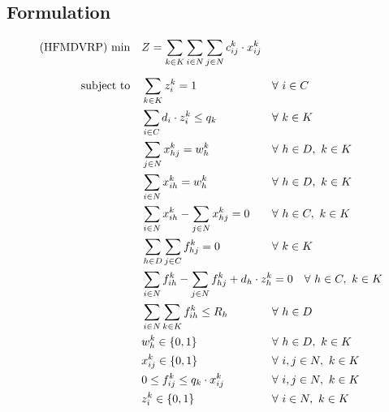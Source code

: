 \documentclass[preprint,review,12pt]{elsarticle}
\begin{document}
\subsection{Formulation}

\begin{align}
    \text{(HFMDVRP) min} \quad        & Z = \sum\limits_{k\in K}\sum\limits_{i\in N}\sum\limits_{j\in N} c_{ij}^k \cdot x_{ij}^k    && \label{MDMVRP_FObj}    \\[5pt]
	\noindent \text{subject to} \quad & \sum\limits_{k \in K} z_{i}^k = 1  && \text{\hspace{-1cm}} \forall \ i \in C \label{MDMVRP_Service} \\
	& \sum\limits_{i \in C}d_i \cdot z_{i}^k \leq q_k               && \text{\hspace{-1cm}} \forall \ k \in K  \label{MDMVRP_Capacity} \\
	& \sum\limits_{j \in N}x_{hj}^k = w_h^k                                         && \text{\hspace{-1cm}} \forall \ h \in D,\ k \in K \label{MDMVRP_StartRoute} \\
	& \sum\limits_{i \in N}x_{ih}^k = w_h^k                                         && \text{\hspace{-1cm}} \forall \ h \in D,\ k \in K \label{MDMVRP_EndRoute} \\
	& \sum\limits_{i \in N}x_{ih}^k - \sum\limits_{j \in N}x_{hj}^k = 0             && \text{\hspace{-1cm}} \forall \ h \in C,\ k \in K \label{MDMVRP_Balance} \\
	& \sum\limits_{h \in D}\sum\limits_{j \in C}f_{hj}^k = 0 && \text{\hspace{-1cm}} \forall \ k \in K \label{MDVMRP_InitialF} \\
	& \sum\limits_{i \in N}f_{ih}^k - \sum\limits_{j \in N}f_{hj}^k + d_h \cdot z_{h}^k = 0             && \text{\hspace{0cm}} \forall \ h \in C,\ k \in K \label{MDMVRP_Flow} \\
	& \sum\limits_{i \in N}\sum\limits_{k \in K}f_{ih}^k \leq R_h  && \text{\hspace{-1cm}} \forall \ h \in D \label{MDMVRP_DepotQ} \\
	& w_h^k \in\{0,1\}  && \text{\hspace{-1cm}} \forall \ h \in D, \ k \in K \label{MDVMRP_DomainW} \\
	& x_{ij}^k\in\{0,1\} && \text{\hspace{-1cm}} \forall \ i,j \in N,  \ k \in K \label{MDVMRP_DomainX} \\
	& 0 \leq f_{ij}^k \leq q_k \cdot x_{ij}^k && \text{\hspace{-1cm}} \forall \ i,j \in N,  \ k \in K \label{MDVMRP_DomainF} \\
	& z_{i}^k\in\{0,1\} && \text{\hspace{-1cm}} \forall \ i \in N,  \ k \in K \label{MDVMRP_DomainZ} 
\end{align}
\end{document}
